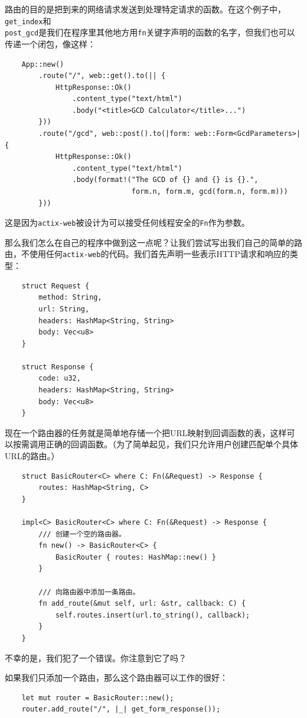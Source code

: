 路由的目的是把到来的网络请求发送到处理特定请求的函数。在这个例子中，\texttt{get\_index}和\\
\texttt{post\_gcd}是我们在程序里其他地方用\texttt{fn}关键字声明的函数的名字，但我们也可以传递一个闭包，像这样：
\begin{verbatim}
    App::new()
        .route("/", web::get().to(|| {
            HttpResponse::Ok()
                .content_type("text/html")
                .body("<title>GCD Calculator</title>...")
        }))
        .route("/gcd", web::post().to(|form: web::Form<GcdParameters>| {
            HttpResponse::Ok()
                .content_type("text/html")
                .body(format!("The GCD of {} and {} is {}.",
                              form.n, form.m, gcd(form.n, form.m)))
        }))
\end{verbatim}

这是因为\texttt{actix-web}被设计为可以接受任何线程安全的\texttt{Fn}作为参数。

那么我们怎么在自己的程序中做到这一点呢？让我们尝试写出我们自己的简单的路由，不使用任何\texttt{actix-web}的代码。我们首先声明一些表示HTTP请求和响应的类型：
\begin{verbatim}
    struct Request {
        method: String,
        url: String,
        headers: HashMap<String, String>
        body: Vec<u8>
    }

    struct Response {
        code: u32,
        headers: HashMap<String, String>
        body: Vec<u8>
    }
\end{verbatim}

现在一个路由器的任务就是简单地存储一个把URL映射到回调函数的表，这样可以按需调用正确的回调函数。（为了简单起见，我们只允许用户创建匹配单个具体URL的路由。）

\begin{verbatim}
    struct BasicRouter<C> where C: Fn(&Request) -> Response {
        routes: HashMap<String, C>
    }

    impl<C> BasicRouter<C> where C: Fn(&Request) -> Response {
        /// 创建一个空的路由器。
        fn new() -> BasicRouter<C> {
            BasicRouter { routes: HashMap::new() }
        }

        /// 向路由器中添加一条路由。
        fn add_route(&mut self, url: &str, callback: C) {
            self.routes.insert(url.to_string(), callback);
        }
    }
\end{verbatim}

不幸的是，我们犯了一个错误。你注意到它了吗？

如果我们只添加一个路由，那么这个路由器可以工作的很好：
\begin{verbatim}
    let mut router = BasicRouter::new();
    router.add_route("/", |_| get_form_response());
\end{verbatim}

